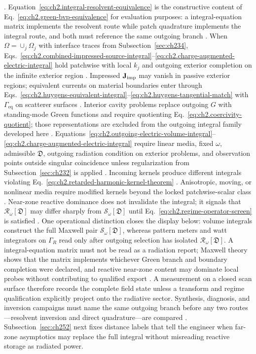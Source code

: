 \cite{stratton1941}. Equation~\eqref{eq:ch2.integral-resolvent-equivalence}
is the constructive content of Eq.~\eqref{eq:ch2.green-bvp-equivalence} for evaluation
purposes: a integral-equation matrix implements the resolvent route while patch quadrature
implements the integral route, and both must reference the same outgoing branch
\cite{harrington2001}.
When \(\Omega=\cup_j\Omega_j\) with interface traces from Subsection~\ref{sec:ch234},
Eqs.~\eqref{eq:ch2.combined-impressed-source-integral}--\eqref{eq:ch2.charge-augmented-electric-integral}
hold patchwise with local \(k_j\) and outgoing exterior completion on the infinite exterior
region \cite{stratton1941}. Impressed \(\mathbf{J}_{\mathrm{imp}}\) may vanish in passive exterior regions;
equivalent currents on material boundaries enter through
Eqs.~\eqref{eq:ch2.huygens-equivalent-integral}--\eqref{eq:ch2.huygens-tangential-match}
with \(\Gamma_{\mathrm{eq}}\) on scatterer surfaces \cite{harrington2001}. Interior
cavity problems replace outgoing \(G\) with standing-mode Green functions and require
quotienting Eq.~\eqref{eq:ch2.coercivity-quotient}; those representations are excluded from
the outgoing integral family developed here \cite{stratton1941}.
Equations~\eqref{eq:ch2.outgoing-electric-volume-integral}--\eqref{eq:ch2.charge-augmented-electric-integral}
require linear media, fixed \(\omega\), admissible \(\mathfrak{D}\), outgoing radiation
condition on exterior problems, and observation points outside singular coincidence unless
regularization from Subsection~\ref{sec:ch232} is applied \cite{stratton1941}. Incoming
kernels produce different integrals violating
Eq.~\eqref{eq:ch2.retarded-harmonic-kernel-theorem} \cite{jackson1999}. Anisotropic,
moving, or nonlinear media require modified kernels beyond the locked patchwise-scalar class
\cite{stratton1941}. Near-zone reactive dominance does not invalidate the integral; it
signals that \(\mathcal{R}_\omega[\mathfrak{D}]\) may differ sharply from
\(\mathcal{S}_\omega[\mathfrak{D}]\) until Eq.~\eqref{eq:ch2.regime-operator-screen} is
satisfied \cite{harrington2001}.
One operational distinction closes the display below: volume integrals construct the full Maxwell pair $\mathcal{S}_\omega[\mathfrak{D}]$, whereas pattern meters and watt integrators on $\Gamma_R$ read only after outgoing selection has isolated $\mathcal{R}_\omega[\mathfrak{D}]$. A integral-equation matrix must not be read as a radiation report; Maxwell theory shows that the matrix implements whichever Green branch and boundary completion were declared, and reactive near-zone content may dominate local probes without contributing to qualified export \cite{stratton1941}. A measurement on a closed scan surface therefore records the complete field state unless a transform and regime qualification explicitly project onto the radiative sector. Synthesis, diagnosis, and inversion campaigns must name the same outgoing branch before any two routes---resolvent inversion and direct quadrature---are compared \cite{harrington2001}. Subsection~\ref{sec:ch252} next fixes distance labels that tell the engineer when far-zone asymptotics may replace the full integral without misreading reactive storage as radiated power.
